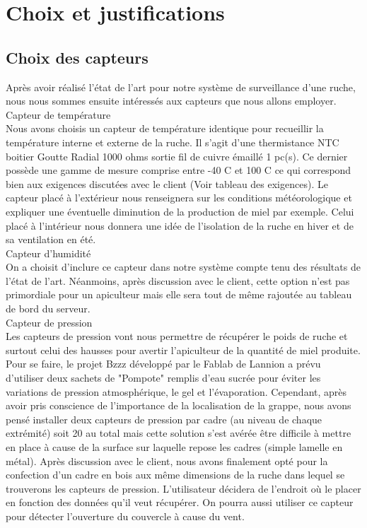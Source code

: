 \chapter{Choix et justifications}

\section{Choix des capteurs}
\vspace{1.5cm}
Après avoir réalisé l'état de l'art pour notre système de surveillance d'une ruche, nous nous sommes ensuite intéressés aux capteurs que nous allons employer.\\

Capteur de température\\

Nous avons choisis un capteur de température identique pour recueillir la température interne et externe de la ruche.
Il s'agit d'une thermistance NTC boitier Goutte Radial 1000 ohms sortie fil de cuivre émaillé 1 pc(s). Ce dernier possède une gamme de mesure comprise entre -40 C et 100 C ce qui correspond bien aux exigences discutées avec le client (Voir tableau des exigences). Le capteur placé à l'extérieur nous renseignera sur les conditions météorologique et expliquer une éventuelle diminution de la production de miel par exemple. Celui placé à l'intérieur nous donnera une idée de l'isolation de la ruche en hiver et de sa ventilation en été.\\  

Capteur d'humidité\\

On a choisit d'inclure ce capteur dans notre système compte tenu des résultats de l'état de l'art. Néanmoins, après discussion avec le client, cette option n'est pas primordiale pour un apiculteur mais elle sera tout de même rajoutée au tableau de bord du serveur.\\

Capteur de pression\\

Les capteurs de pression vont nous permettre de récupérer le poids de ruche et surtout celui des hausses pour avertir l'apiculteur de la quantité de miel produite. Pour se faire, le projet Bzzz développé par le Fablab de Lannion a prévu d'utiliser deux sachets de "Pompote" remplis d'eau sucrée pour éviter les variations de pression atmosphérique, le gel et l'évaporation. Cependant, après avoir pris conscience de l'importance de la localisation de la grappe, nous avons pensé installer deux capteurs de pression par cadre (au niveau de chaque extrémité) soit 20 au total mais cette solution s'est avérée être difficile à mettre en place à cause de la surface sur laquelle repose les cadres (simple lamelle en métal). Après discussion avec le client, nous avons finalement opté pour la confection d'un cadre en bois aux même dimensions de la ruche dans lequel se trouverons les capteurs de pression. L'utilisateur décidera de l'endroit où le placer en fonction des données qu'il veut récupérer. 
On pourra aussi utiliser ce capteur pour détecter l'ouverture du couvercle à cause du vent.\\

